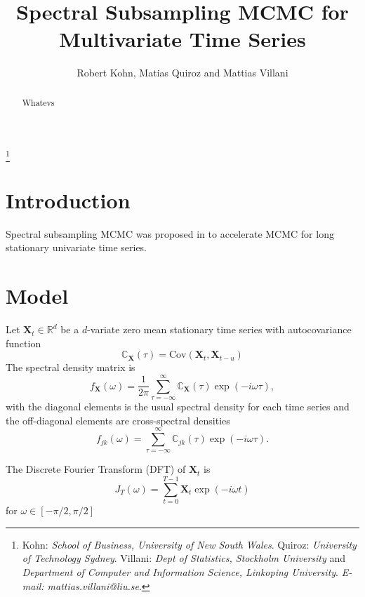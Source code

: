 \documentclass[11pt,oneside,english]{amsart}
\numberwithin{equation}{section}
\numberwithin{figure}{section}
\theoremstyle{plain}
\numberwithin{equation}{section}
\begin{document}
\title[Multivariate Spectral Subsampling MCMC]{Spectral Subsampling MCMC for Multivariate Time Series}
\author{Robert Kohn, Matias Quiroz and Mattias Villani}
\thanks{
Kohn: \textit{School of Business, University of New South Wales}. 
Quiroz: \textit{University of Technology Sydney}.
Villani: \textit{Dept of Statistics, Stockholm University} and 
\textit{Department of Computer and Information Science, Linkoping University}.
\textit{E-mail: mattias.villani@liu.se}.
}

\begin{abstract}
Whatevs 
\end{abstract}

\maketitle

\section{Introduction}

Spectral subsampling MCMC was proposed in \citet{salomone2019spectral} to accelerate
MCMC for long stationary univariate time series.


\section{Model}
Let $\mathbf{X}_t \in \mathbb{R}^d$ be a $d$-variate zero mean stationary time series with autocovariance
function
\begin{equation}
    \mathbb{C}_{\mathbf{X}}(\tau) = \mathrm{Cov}(\mathbf{X}_t,\mathbf{X}_{t-u})
\end{equation}
The spectral density matrix is
\begin{equation}
    f_{\mathbf{X}}(\omega) = \frac{1}{2\pi}\sum_{\tau=-\infty}^\infty 
        \mathbb{C}_{\mathbf{X}}(\tau)\exp(-i\omega \tau),
\end{equation}
with the diagonal elements is the usual spectral density for each time series and the off-diagonal
elements are cross-spectral densities 
\begin{equation}
    f_{jk}(\omega) = \sum_{\tau=-\infty}^\infty \mathbb{C}_{jk}(\tau)\exp(-i\omega \tau).
\end{equation}   

The Discrete Fourier Transform (DFT) of $\mathbf{X}_t$ is
\begin{equation}
    J_T(\omega) = \sum_{t=0}^{T-1} \mathbf{X}_t \exp(-i\omega t)
\end{equation}
for $\omega \in [-\pi/2,\pi/2]$
\end{document}
